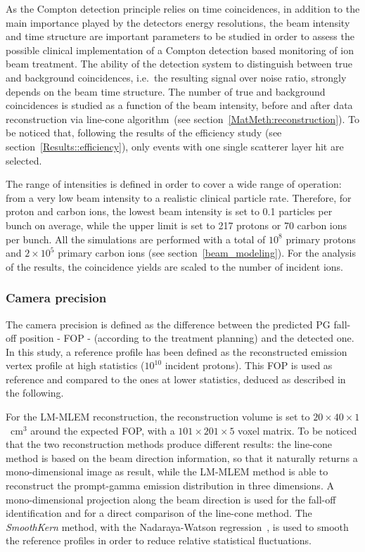 As the Compton detection principle relies on time coincidences, in addition to the main importance played by the detectors energy resolutions, the beam intensity and time structure are important parameters to be studied in order to assess the possible clinical implementation of a Compton detection based monitoring of ion beam treatment. The ability of the detection system to distinguish between true and background coincidences, i.e.~the resulting signal over noise ratio, strongly depends on the beam time structure. The number of true and background coincidences is studied as a function of the beam intensity, before and after data reconstruction via line-cone algorithm~(see section~\ref{MatMeth:reconstruction}). To be noticed that, following the results of the efficiency study (see section~\ref{Results::efficiency}), only events with one single scatterer layer hit are selected. 

The range of intensities is defined in order to cover a wide range of operation: from a very low beam intensity to a realistic clinical particle rate. Therefore, for proton and carbon ions, the lowest beam intensity is set to 0.1 particles per bunch on average, while the upper limit is set to 217 protons or 70 carbon ions per bunch. All the simulations are performed with a total of $10^{8}$ primary protons and  $2\times10^{5}$ primary carbon ions (see section~\ref{beam_modeling}). For the analysis of the results, the coincidence yields are scaled to the number of incident ions.

\subsubsection{Camera precision}
\label{MatMeth:precision}

The camera precision is defined as the difference between the predicted PG fall-off position - FOP - (according to the treatment planning) and the detected one.
In this study, a reference profile has been defined as the reconstructed emission vertex profile at high statistics ($\mathrm{10^{10}}$ incident protons). This FOP is used as reference and compared to the ones at lower statistics, deduced as described in the following.

For the LM-MLEM reconstruction, the reconstruction volume is set to $20\times40\times1$~cm$^3$ around the expected FOP, with a $101\times201\times5$ voxel matrix. To be noticed that the two reconstruction methods produce different results: the line-cone method is based on the beam direction information, so that it naturally returns a mono-dimensional image as result, while the LM-MLEM method is able to reconstruct the prompt-gamma emission distribution in three dimensions. A mono-dimensional projection along the beam direction is used for the fall-off identification and for a direct comparison of the line-cone method.
The \textit{SmoothKern} method, with the Nadaraya-Watson regression~\cite{Nadaraya_regression, Watson_regression}, is used to smooth the reference profiles in order to reduce relative statistical fluctuations.

